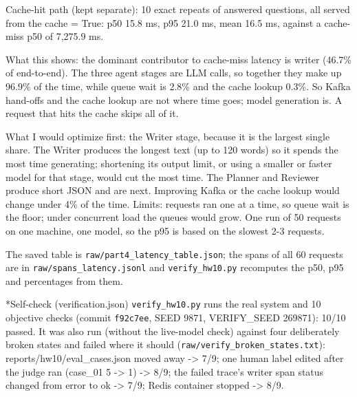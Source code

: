 \documentclass[11pt]{article}
\makeatletter
\renewcommand\section{\@startsection{section}{1}{\z@}{-3.0ex \@plus -1ex \@minus -.2ex}{1.2ex \@plus.2ex}{\normalfont\fontsize{14}{17}\selectfont\bfseries}}
\makeatother
\begin{document}
Cache-hit path (kept separate): 10 exact repeats of answered questions, all served from the cache = True: p50 15.8 ms, p95 21.0 ms, mean 16.5 ms, against a cache-miss p50 of 7,275.9 ms.

What this shows: the dominant contributor to cache-miss latency is writer (46.7\% of end-to-end). The three agent stages are LLM calls, so together they make up 96.9\% of the time, while queue wait is 2.8\% and the cache lookup 0.3\%. So Kafka hand-offs and the cache lookup are not where time goes; model generation is. A request that hits the cache skips all of it.

What I would optimize first: the Writer stage, because it is the largest single share. The Writer produces the longest text (up to 120 words) so it spends the most time generating; shortening its output limit, or using a smaller or faster model for that stage, would cut the most time. The Planner and Reviewer produce short JSON and are next. Improving Kafka or the cache lookup would change under 4\% of the time. Limits: requests ran one at a time, so queue wait is the floor; under concurrent load the queues would grow. One run of 50 requests on one machine, one model, so the p95 is based on the slowest 2-3 requests.

The saved table is \texttt{raw/\allowbreak{}part4\_\allowbreak{}latency\_\allowbreak{}table.json}; the spans of all 60 requests are in \texttt{raw/\allowbreak{}spans\_\allowbreak{}latency.jsonl} and \texttt{verify\_\allowbreak{}hw10.py} recomputes the p50, p95 and percentages from them.

\section*{Self-check (verification.json)}
\texttt{verify\_\allowbreak{}hw10.py} runs the real system and 10 objective checks (commit \texttt{f92c7ee}, SEED 9871, VERIFY\_\allowbreak{}SEED 269871): 10/10 passed. It was also run (without the live-model check) against four deliberately broken states and failed where it should (\texttt{raw/\allowbreak{}verify\_\allowbreak{}broken\_\allowbreak{}states.txt}): reports/hw10/eval\_\allowbreak{}cases.json moved away -> 7/9; one human label edited after the judge ran (case\_\allowbreak{}01 5 -> 1) -> 8/9; the failed trace's writer span status changed from error to ok -> 7/9; Redis container stopped -> 8/9.
\end{document}
